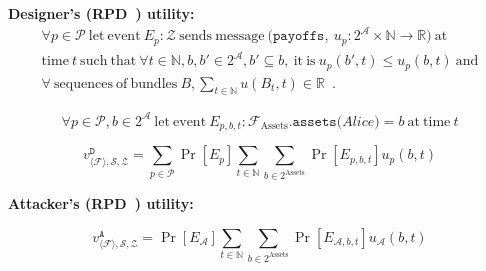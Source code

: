 \noindent \textbf{Designer's (RPD~\cite{rationalprotocol}) utility:}
\begin{gather*}
  \forall p \in \mathcal{P} \: \mathrm{let \: event} \: E_p: \mathcal{Z} \: \mathrm{sends
  \: message} \: \mathtt{(payoffs,} \: u_p:2^{\mathcal{A}} \times \mathbb{N} \rightarrow
  \mathbb{R} \mathtt{)} \: \mathrm{at} \\
  \mathrm{time} \: t \: \mathrm{such \: that} \: \forall t \in \mathbb{N}, b, b' \in
  2^{\mathcal{A}}, b' \subseteq b, \: \mathrm{it \: is} \: u_p\left(b', t\right) \leq
  u_p\left(b, t\right) \: \mathrm{and} \\
  \forall \: \mathrm{sequences \: of \: bundles} \: B, \sum\limits_{t \in
  \mathbb{N}}u\left(B_t, t\right) \in \mathbb{R}\enspace.
\end{gather*}

\begin{equation*}
  \forall p \in \mathcal{P}, b \in 2^{\mathcal{A}} \: \mathrm{let \: event} \: E_{p, b,
  t}: \mathcal{F}_{\mathrm{Assets}}.\mathtt{assets(}Alice\mathtt{)} = b \: \mathrm{at \:
  time} \: t
\end{equation*}

\begin{equation*}
  v^{\mathtt{D}}_{\langle \mathcal{F} \rangle, \mathcal{S}, \mathcal{Z}} = \sum\limits_{p
  \in \mathcal{P}} \Pr\left[E_p\right] \sum\limits_{t \in \mathbb{N}} \sum\limits_{b \in
  2^{\mathrm{Assets}}} \Pr\left[E_{p, b, t}\right] u_p\left(b, t\right)
\end{equation*}

\noindent \textbf{Attacker's (RPD~\cite{rationalprotocol}) utility:}

\begin{equation*}
  v^{\mathtt{A}}_{\langle \mathcal{F} \rangle, \mathcal{S}, \mathcal{Z}} =
  \Pr\left[E_\mathcal{A}\right] \sum\limits_{t \in \mathbb{N}} \sum\limits_{b \in
  2^{\mathrm{Assets}}} \Pr\left[E_{\mathcal{A}, b, t}\right] u_{\mathcal{A}}\left(b,
  t\right)
\end{equation*}
